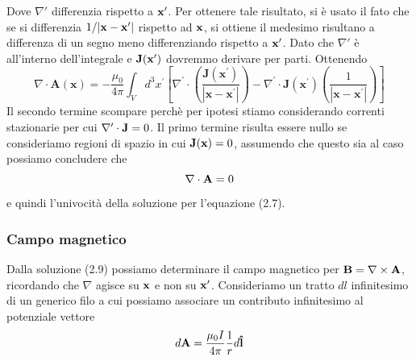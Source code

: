 Dove $\nabla'$ differenzia rispetto a $\bold{x}'$. Per ottenere tale risultato, si \`e usato il fato che se si differenzia $1/|\bold{x} - \bold{x}'|$ rispetto ad $\bold{x}$, si ottiene il medesimo risultano a differenza di un segno meno differenziando rispetto a $\bold{x}'$. Dato che $\nabla'$ \`e all'interno dell'integrale e $\bold{J}(\bold{x}')$ dovremmo derivare per parti. Ottenendo 
\begin{equation*}
\nabla \cdot \mathbf{A}(\mathbf{x})=-\frac{\mu_0}{4 \pi} \int_V d^3 x^{\prime}\left[\nabla^{\prime} \cdot\left(\frac{\mathbf{J}\left(\mathbf{x}^{\prime}\right)}{\left|\mathbf{x}-\mathbf{x}^{\prime}\right|}\right)-\nabla^{\prime} \cdot \mathbf{J}\left(\mathbf{x}^{\prime}\right)\left(\frac{1}{\left|\mathbf{x}-\mathbf{x}^{\prime}\right|}\right)\right]
\end{equation*}
Il secondo termine scompare perch\`e per ipotesi stiamo considerando correnti stazionarie per cui $\nabla' \cdot \bold{J} = 0$. Il primo termine risulta essere nullo se consideriamo regioni di spazio in cui $\bold{J}(\bold{x}) = 0$, assumendo che questo sia al caso possiamo concludere che 
\begin{equation*}
	\nabla \cdot \bold{A} = 0
\end{equation*}
e quindi l'univocit\`a della soluzione per l'equazione (2.7).
\newpage 


\subsubsection{Campo magnetico}

Dalla soluzione (2.9) possiamo determinare il campo magnetico per $\bold{B} = \nabla \times \bold{A}$, ricordando che $\nabla$ agisce su $\bold{x}$ e non su $\bold{x}'$. Consideriamo un tratto $dl$ infinitesimo di un generico filo a cui possiamo associare un contributo infinitesimo al potenziale vettore 
\begin{equation*}
	d\bold{A} = \frac{\mu_0I}{4\pi} \frac{1}{r} d\bold{\hat{l}}
\end{equation*}

